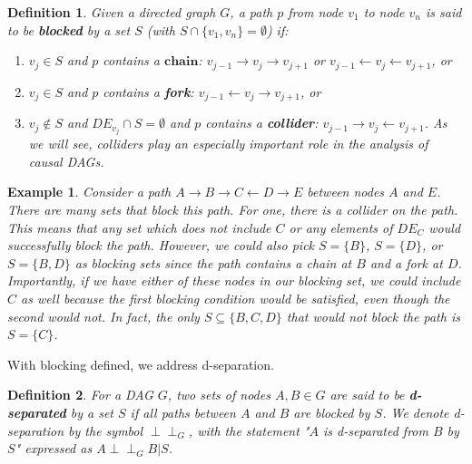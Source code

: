 \documentclass[12pt]{article}
\newtheorem{example}{Example}
\newtheorem{definition}{Definition}[section]
\theoremstyle{definition}
\newcommand{\dsep}{\perp \!\!\!\perp}
\begin{document}
\begin{definition}
Given a directed graph $G$, a path $p$ from node $v_1$ to node $v_n$ is said to be \textbf{\emph{blocked}} by a set $S$ (with $S \cap \{v_1, v_n\} = \emptyset$) if:
\begin{enumerate}
\item $v_j \in S$ and $p$ contains a $\mathbf{chain}$: $v_{j-1} \rightarrow v_j \rightarrow v_{j+1}$ or $v_{j-1} \leftarrow v_j \leftarrow v_{j+1}$, or

\item $v_j \in S$ and $p$ contains a \textbf{\emph{fork}}: $v_{j-1} \leftarrow v_j \rightarrow v_{j+1}$, or

\item $v_j \notin S$ and $DE_{v_j} \cap S = \emptyset$ and $p$ contains a \textbf{\emph{collider}}: $v_{j-1} \rightarrow v_j \leftarrow v_{j+1}$. As we will see, colliders play an especially important role in the analysis of causal DAGs.
\end{enumerate}
\end{definition}

\begin{example}
Consider a path $A \rightarrow B \rightarrow C \leftarrow D \rightarrow E$ between nodes $A$ and $E$. There are many sets that block this path. For one, there is a collider on the path. This means that any set which does not include $C$ or any elements of $DE_C$ would successfully block the path. However, we could also pick $S = \{B\}$, $S= \{D\}$, or $S = \{B,D\}$ as blocking sets since the path contains a chain at $B$ and a  fork at $D$. Importantly, if we have either of these nodes in our blocking set, we could include $C$ as well because the first blocking condition would be satisfied, even though the second would not. In fact, the only $S \subseteq \{B,C,D\}$ that would not block the path is $S = \{C\}$.
\end{example}

With blocking defined, we address d-separation. 

\begin{definition}
For a DAG $G$, two sets of nodes $A,B \in G$ are said to be  \textbf{\emph{d-separated}} by a set $S$ if all paths between $A$ and $B$ are blocked by $S$. We denote d-separation by the symbol $\perp \!\!\!\perp_G$, with the statement "$A$ is d-separated from $B$ by $S$" expressed as $A \dsep_G B | S$. 
\end{definition}
\end{document}
